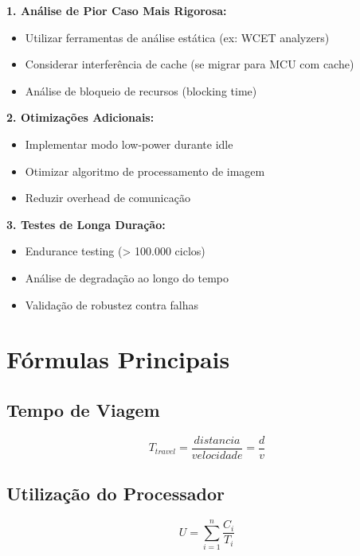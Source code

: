 \documentclass[12pt,a4paper]{article}
\begin{document}
\textbf{1. Análise de Pior Caso Mais Rigorosa:}
\begin{itemize}
    \item Utilizar ferramentas de análise estática (ex: WCET analyzers)
    \item Considerar interferência de cache (se migrar para MCU com cache)
    \item Análise de bloqueio de recursos (blocking time)
\end{itemize}

\textbf{2. Otimizações Adicionais:}
\begin{itemize}
    \item Implementar modo low-power durante idle
    \item Otimizar algoritmo de processamento de imagem
    \item Reduzir overhead de comunicação
\end{itemize}

\textbf{3. Testes de Longa Duração:}
\begin{itemize}
    \item Endurance testing (> 100.000 ciclos)
    \item Análise de degradação ao longo do tempo
    \item Validação de robustez contra falhas
\end{itemize}

\appendix

\section{Fórmulas Principais}

\subsection{Tempo de Viagem}
\begin{equation}
T_{travel} = \frac{distancia}{velocidade} = \frac{d}{v}
\end{equation}

\subsection{Utilização do Processador}
\begin{equation}
U = \sum_{i=1}^{n} \frac{C_i}{T_i}
\end{equation}
\end{document}
